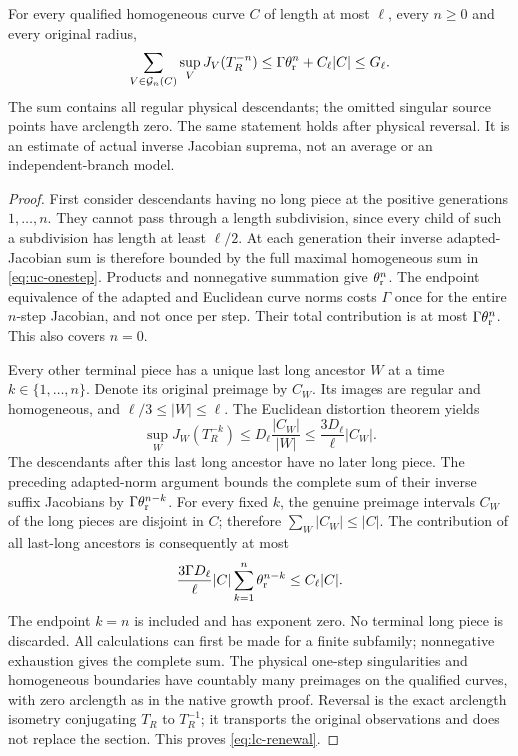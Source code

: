 \begin{theorem}\label{thm:lc-renewal}
For every qualified homogeneous curve $C$ of length at most $\ell$,
every $n\ge0$ and every original radius,
\begin{equation}\label{eq:lc-renewal}
 \sum_{V\in\mathcal G_n(C)}
        \sup_V J_V(T_R^{-n})
       \le \Gamma\theta_{\rm r}^{n}+C_\ell|C|
       \le G_\ell.
\end{equation}
The sum contains all regular physical descendants; the omitted singular
source points have arclength zero.  The same statement holds after
physical reversal.  It is an estimate of actual inverse Jacobian
suprema, not an average or an independent-branch model.
\end{theorem}
\begin{proof}
First consider descendants having no long piece at the positive
generations $1,\ldots,n$.  They cannot pass through a length subdivision,
since every child of such a subdivision has length at least $\ell/2$.
At each generation their inverse adapted-Jacobian sum is therefore
bounded by the full maximal homogeneous sum in
\eqref{eq:uc-onestep}.  Products and nonnegative summation give
$\theta_{\rm r}^n$.  The endpoint equivalence of the adapted and
Euclidean curve norms costs $\Gamma$ once for the entire $n$-step
Jacobian, and not once per step.  Their total contribution is at most
$\Gamma\theta_{\rm r}^n$.  This also covers $n=0$.

Every other terminal piece has a unique last long ancestor $W$ at a
time $k\in\{1,\ldots,n\}$.  Denote its original preimage by $C_W$.
Its images are regular and homogeneous, and $\ell/3\le |W|\le\ell$.
The Euclidean distortion theorem yields
\[
 \sup_W J_W(T_R^{-k})
 \le D_\ell\frac{|C_W|}{|W|}
 \le \frac{3D_\ell}{\ell}|C_W|.
\]
The descendants after this last long ancestor have no later long
piece.  The preceding adapted-norm argument bounds the complete sum
of their inverse suffix Jacobians by
$\Gamma\theta_{\rm r}^{n-k}$.  For every fixed $k$, the genuine
preimage intervals $C_W$ of the long pieces are disjoint in $C$;
therefore $\sum_W|C_W|\le |C|$.  The contribution of all last-long
ancestors is consequently at most
\[
 \frac{3\Gamma D_\ell}{\ell}|C|
       \sum_{k=1}^{n}\theta_{\rm r}^{n-k}
 \le C_\ell|C|.
\]
The endpoint $k=n$ is included and has exponent zero.  No terminal
long piece is discarded.  All calculations can first be made for a
finite subfamily; nonnegative exhaustion gives the complete sum.
The physical one-step singularities and homogeneous boundaries have
countably many preimages on the qualified curves, with zero arclength
as in the native growth proof.  Reversal is the exact arclength
isometry conjugating $T_R$ to $T_R^{-1}$; it transports the original
observations and does not replace the section.  This proves
\eqref{eq:lc-renewal}.
\end{proof}

